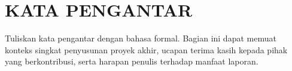 \cleardoublepage
\chapter*{KATA PENGANTAR}
\thispagestyle{fancy}

Tuliskan kata pengantar dengan bahasa formal. Bagian ini dapat memuat konteks singkat
penyusunan proyek akhir, ucapan terima kasih kepada pihak yang berkontribusi, serta
harapan penulis terhadap manfaat laporan.